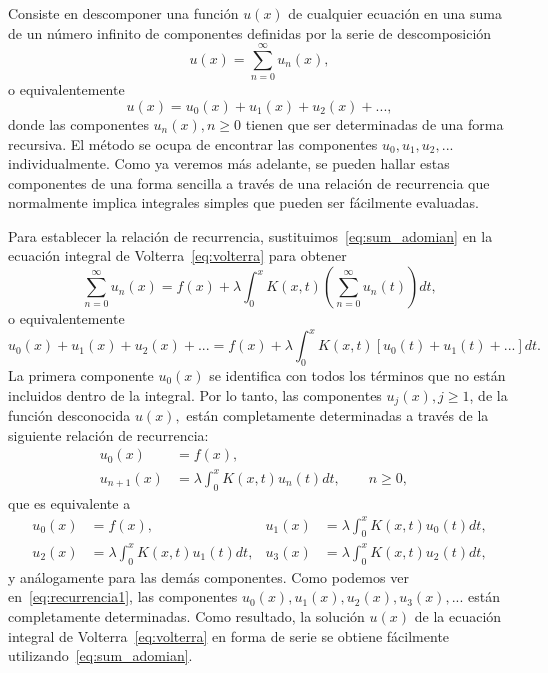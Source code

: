 Consiste en descomponer una función $u(x)$ de cualquier ecuación en una suma de un número infinito de componentes definidas por la serie de descomposición
\begin{equation}\label{eq:sum_adomian}
	u(x) = \sum_{n=0}^{\infty} u_n(x),
\end{equation} 
o equivalentemente 
\begin{equation}
	u(x) = u_0(x) + u_1(x) + u_2(x) + ... ,
\end{equation} 
donde las componentes $u_n(x), n \geqslant 0$ tienen que ser determinadas de una forma recursiva. El método se ocupa de encontrar las componentes $u_0, u_1, u_2, ...$ individualmente. Como ya veremos más adelante, se pueden hallar estas componentes de una forma sencilla a través de una relación de recurrencia que normalmente implica integrales simples que pueden ser fácilmente evaluadas.

Para establecer la relación de recurrencia, sustituimos~\eqref{eq:sum_adomian} en la ecuación integral de Volterra~\eqref{eq:volterra} para obtener 
\begin{equation}
	\sum_{n=0}^{\infty} u_n(x) = f(x) + \lambda \int_{0}^{x} K(x,t)(\sum_{n=0}^{\infty} u_n(t))dt,
\end{equation}
o equivalentemente
\begin{equation}
	u_0(x) + u_1(x) + u_2(x) + ... = f(x) + \lambda \int_{0}^{x} K(x,t)[u_0(t) + u_1(t) + ...]dt.
\end{equation}
La primera componente $u_0(x)$ se identifica con todos los términos que no están incluidos dentro de la integral. Por lo tanto, las componentes $u_j(x), j \geqslant 1$, de la función desconocida $u(x),$ están completamente determinadas a través de la siguiente relación de recurrencia:
\begin{align}
	u_0(x) &= f(x),      &   \\
	u_{n+1}(x) &= \lambda \int_{0}^{x} K(x,t)u_n(t)dt, \qquad n \geqslant 0,         & 
\end{align}
que es equivalente a 
\begin{align}\label{eq:recurrencia1}
	u_0(x)&=f(x),          &  u_1(x) &=\lambda \int_{0}^{x} K(x,t)u_0(t)dt,      \\
	u_2(x)&=\lambda \int_{0}^{x} K(x,t)u_1(t)dt,   &  u_3(x)&=\lambda \int_{0}^{x} K(x,t)u_2(t)dt, 
\end{align}
y análogamente para las demás componentes. Como podemos ver en~\eqref{eq:recurrencia1}, las componentes $u_0(x), u_1(x), u_2(x), u_3(x),...$ están completamente determinadas. Como resultado, la solución $u(x)$ de la ecuación integral de Volterra~\eqref{eq:volterra} en forma de serie se obtiene fácilmente utilizando~\eqref{eq:sum_adomian}.

